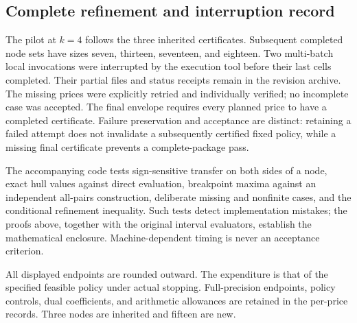 \subsection{Complete refinement and interruption record}
The pilot at $k=4$ follows the three inherited certificates. Subsequent completed node sets have sizes seven, thirteen, seventeen, and eighteen. Two multi-batch local invocations were interrupted by the execution tool before their last cells completed. Their partial files and status receipts remain in the revision archive. The missing prices were explicitly retried and individually verified; no incomplete case was accepted. The final envelope requires every planned price to have a completed certificate. Failure preservation and acceptance are distinct: retaining a failed attempt does not invalidate a subsequently certified fixed policy, while a missing final certificate prevents a complete-package pass.

The accompanying code tests sign-sensitive transfer on both sides of a node, exact hull values against direct evaluation, breakpoint maxima against an independent all-pairs construction, deliberate missing and nonfinite cases, and the conditional refinement inequality. Such tests detect implementation mistakes; the proofs above, together with the original interval evaluators, establish the mathematical enclosure. Machine-dependent timing is never an acceptance criterion.

\begin{table}[t]\centering\scriptsize
\caption{All cost-continuation node certificates}\label{r12:nodes}

\par\smallskip\footnotesize All displayed endpoints are rounded outward. The expenditure is that of the specified feasible policy under actual stopping. Full-precision endpoints, policy controls, dual coefficients, and arithmetic allowances are retained in the per-price records. Three nodes are inherited and fifteen are new.
\end{table}
